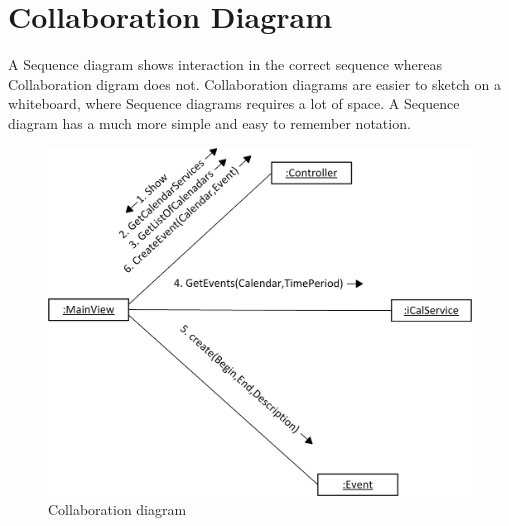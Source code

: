 \section{Collaboration Diagram}
A Sequence diagram shows interaction in the correct sequence whereas Collaboration digram does not.
Collaboration diagrams are easier to sketch on a whiteboard, where Sequence diagrams requires a lot of space.
A Sequence diagram has a much more simple and easy to remember notation.

\begin{figure}[h!]
  \includegraphics[width=\textwidth,natwidth=1192,natheight=979]{illustrations/CollaborationDiagram.png}
  \caption{Collaboration diagram}
\end{figure}
\newpage